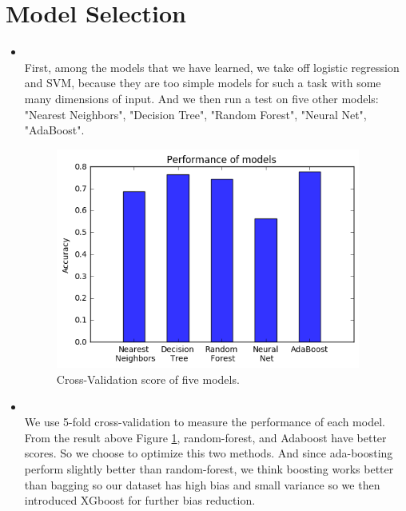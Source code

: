\section{Model Selection}
\medskip
\begin{itemize}

    \item {} \\
    First, among the models that we have learned, we take off logistic regression and SVM, because they are too simple models for such a task with some many dimensions of input. And we then run a test on five other models: "Nearest Neighbors", "Decision Tree", "Random Forest", "Neural Net", "AdaBoost". 
    
    \begin{figure}                           
    \centering
    \includegraphics[width=10cm]{performanceOFmodels.png}
    \caption{Cross-Validation score of five models.}
    \label{perOFmodel}
    \end{figure}

    \item {} \\
    We use 5-fold cross-validation to measure the performance of each model. From the result above Figure \ref{perOFmodel}, random-forest, and Adaboost have better scores. So we choose to optimize this two methods. And since ada-boosting perform slightly better than random-forest, we think boosting works better than bagging so our dataset has high bias and small variance so we then introduced XGboost for further bias reduction.

\end{itemize}



